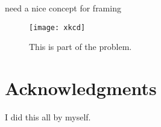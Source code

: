 \documentclass[conference]{IEEEtran}
\begin{document}
need a nice concept for framing

\begin{figure}[!t]
\centering
\texttt{[image: xkcd]}
\caption{This is part of the problem.}
\label{fig:xkcd}
\end{figure}

%



\section*{Acknowledgments}

I did this all by myself.









\end{document}
